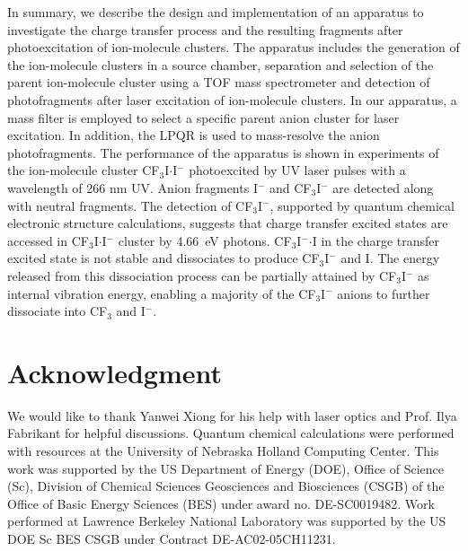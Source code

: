 \documentclass[%
aip,
rsi,
 amsmath,amssymb,
reprint,%
]{revtex4-1}
\begin{document}
In summary, we describe the design and implementation of an apparatus to investigate the charge transfer process and the resulting fragments after photoexcitation of ion-molecule clusters. The apparatus includes the generation of the ion-molecule clusters in a source chamber, separation and selection of the parent ion-molecule cluster using a TOF mass spectrometer and detection of photofragments after laser excitation of ion-molecule clusters. In our apparatus, a mass filter is employed to select a specific parent anion cluster for laser excitation. In addition, the LPQR is used to mass-resolve the anion photofragments. The performance of the apparatus is shown in experiments of the ion-molecule cluster CF$_3$I$\cdot$I$^-$ photoexcited by UV laser pulses with a wavelength of 266 nm UV. Anion fragments I$^-$ and CF$_3$I$^-$ are detected along with neutral fragments. The detection of CF$_3$I$^-$, supported by quantum chemical electronic structure calculations, suggests that charge transfer excited states are accessed in CF$_3$I$\cdot$I$^-$ cluster by 4.66~eV photons. CF$_3$I$^-$$\cdot$I in the charge transfer excited state is not stable and dissociates to produce CF$_3$I$^-$ and I. The energy released from this dissociation process can be partially attained by CF$_3$I$^-$ as internal vibration energy, enabling a majority of the CF$_3$I$^-$ anions to further dissociate into CF$_3$ and I$^-$.




\section{Acknowledgment}

We would like to thank Yanwei Xiong for his help with laser optics and Prof. Ilya Fabrikant for helpful discussions. Quantum chemical calculations were performed with resources at the University of Nebraska Holland Computing Center. This work was supported by the US Department of Energy (DOE), Office of Science (Sc), Division of Chemical Sciences Geosciences and Biosciences (CSGB) of the Office of Basic Energy Sciences (BES) under award no. DE-SC0019482. Work performed at Lawrence Berkeley National Laboratory was supported by the US DOE Sc BES CSGB under Contract DE-AC02-05CH11231. 
\end{document}

